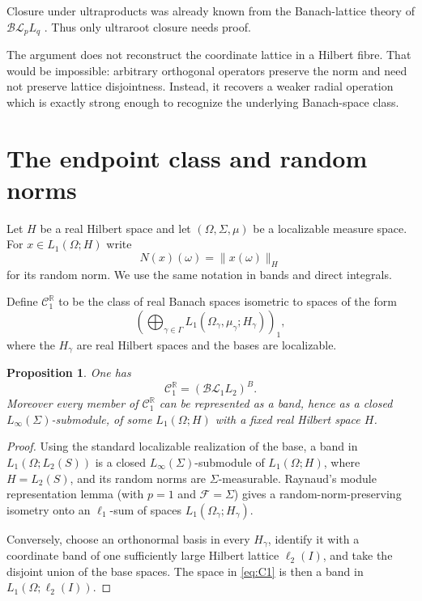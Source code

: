 \documentclass[11pt]{article}
\newcommand{\BL}{\mathcal{BL}}
\newcommand{\C}{\mathcal C}
\newcommand{\R}{\mathbb R}
\newcommand{\1}{\mathbf 1}
\newtheorem{proposition}[theorem]{Proposition}
\theoremstyle{definition}
\theoremstyle{remark}
\begin{document}
Closure under ultraproducts was already known from the Banach-lattice theory
of $\BL_pL_q$ \cite{HensonRaynaud2007,Raynaud2018}.  Thus only ultraroot
closure needs proof.

The argument does not reconstruct the coordinate lattice in a Hilbert
fibre.  That would be impossible: arbitrary orthogonal operators preserve
the norm and need not preserve lattice disjointness.  Instead, it recovers a
weaker radial operation which is exactly strong enough to recognize the
underlying Banach-space class.

\section{The endpoint class and random norms}

Let $H$ be a real Hilbert space and let $(\Omega,\Sigma,\mu)$ be a localizable
measure space.  For $x\in L_1(\Omega;H)$ write
\[
             N(x)(\omega)=\|x(\omega)\|_H
\]
for its random norm.  We use the same notation in bands and direct
integrals.

Define $\C_1^{\R}$ to be the class of real Banach spaces isometric to spaces
of the form
\begin{equation}
\label{eq:C1}
       \left(\bigoplus_{\gamma\in\Gamma}
       L_1(\Omega_\gamma,\mu_\gamma;H_\gamma)\right)_1,
\end{equation}
where the $H_\gamma$ are real Hilbert spaces and the bases are localizable.

\begin{proposition}
\label{prop:C1=BL}
One has
\[
                   \C_1^{\R}=(\BL_1L_2)^B.
\]
Moreover every member of $\C_1^{\R}$ can be represented as a band, hence as
a closed $L_\infty(\Sigma)$-submodule, of some $L_1(\Omega;H)$ with a fixed
real Hilbert space $H$.
\end{proposition}

\begin{proof}
Using the standard localizable realization of the base, a band in
$L_1(\Omega;L_2(S))$ is a closed $L_\infty(\Sigma)$-submodule of
$L_1(\Omega;H)$, where $H=L_2(S)$, and its random norms are
$\Sigma$-measurable.  Raynaud's module representation lemma
\cite[Lemma~4.4]{Raynaud2004} (with $p=1$ and $\mathcal F=\Sigma$) gives a
random-norm-preserving isometry onto an $\ell_1$-sum of spaces
$L_1(\Omega_\gamma;H_\gamma)$.

Conversely, choose an orthonormal basis in every $H_\gamma$, identify it
with a coordinate band of one sufficiently large Hilbert lattice
$\ell_2(I)$, and take the disjoint union of the base spaces.  The space in
\eqref{eq:C1} is then a band in $L_1(\Omega;\ell_2(I))$.
\end{proof}
\end{document}
